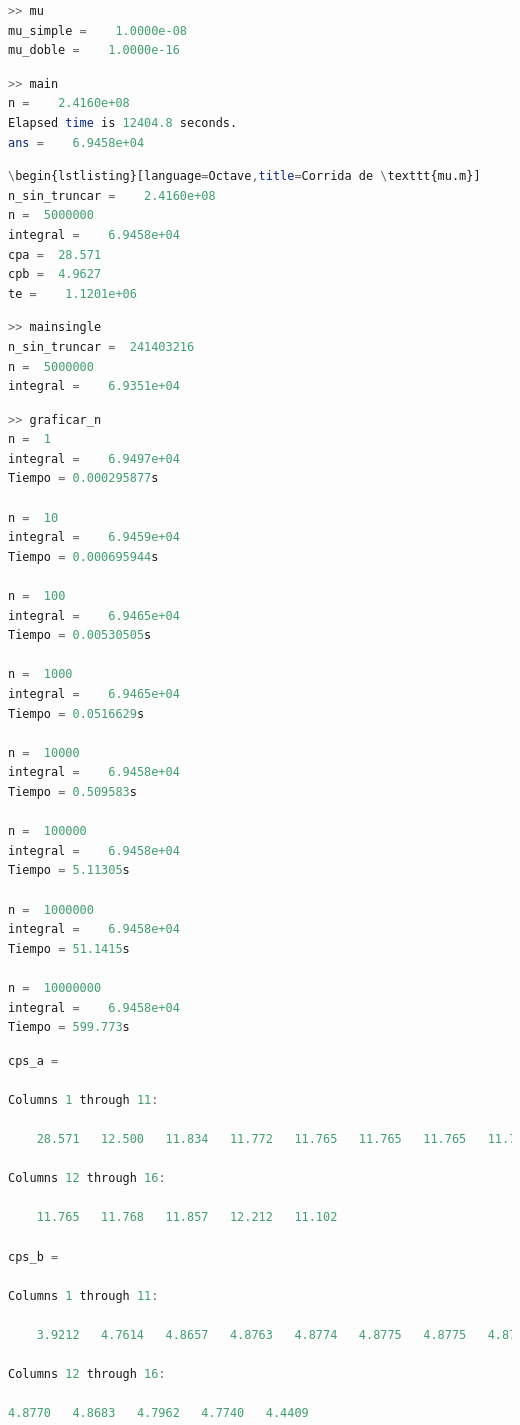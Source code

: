 \documentclass[11pt,a4paper]{article}
\begin{document}
\begin{lstlisting}[language=Octave,title=Corrida de \texttt{mu.m}]
>> mu
mu_simple =    1.0000e-08
mu_doble =    1.0000e-16
\end{lstlisting}

\begin{lstlisting}[language=Octave,title=title=Corrida de \texttt{main.m} con n original]
>> main
n =    2.4160e+08
Elapsed time is 12404.8 seconds.
ans =    6.9458e+04
\end{lstlisting}

\begin{lstlisting}[language=Octave,title=title=Corrida de \texttt{main.m}]
\begin{lstlisting}[language=Octave,title=Corrida de \texttt{mu.m}]
n_sin_truncar =    2.4160e+08
n =  5000000
integral =    6.9458e+04  
cpa =  28.571
cpb =  4.9627
te =    1.1201e+06
\end{lstlisting}

\begin{lstlisting}[language=Octave,title=title=Corrida de \texttt{mainsingle.m}]
>> mainsingle
n_sin_truncar =  241403216
n =  5000000
integral =    6.9351e+04
\end{lstlisting}

\begin{lstlisting}[language=Octave,title=Cálculos hechos para el criterio de truncamiento de n]
>> graficar_n
n =  1
integral =    6.9497e+04
Tiempo = 0.000295877s

n =  10
integral =    6.9459e+04
Tiempo = 0.000695944s

n =  100
integral =    6.9465e+04
Tiempo = 0.00530505s

n =  1000
integral =    6.9465e+04
Tiempo = 0.0516629s

n =  10000
integral =    6.9458e+04
Tiempo = 0.509583s

n =  100000
integral =    6.9458e+04
Tiempo = 5.11305s

n =  1000000
integral =    6.9458e+04
Tiempo = 51.1415s

n =  10000000
integral =    6.9458e+04
Tiempo = 599.773s
\end{lstlisting}


\begin{lstlisting}[language=Octave,title=Cps calculados para las distintas iteraciones]
cps_a =

Columns 1 through 11:

    28.571   12.500   11.834   11.772   11.765   11.765   11.765   11.765   11.765   11.765   11.765

Columns 12 through 16:

    11.765   11.768   11.857   12.212   11.102

cps_b =

Columns 1 through 11:

    3.9212   4.7614   4.8657   4.8763   4.8774   4.8775   4.8775   4.8775   4.8775   4.8775   4.8776

Columns 12 through 16:

4.8770   4.8683   4.7962   4.7740   4.4409
\end{lstlisting}
\end{document}
